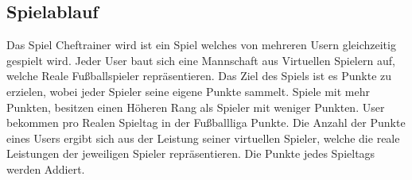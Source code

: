 \subsection{Spielablauf}
Das Spiel Cheftrainer wird ist ein Spiel welches von mehreren Usern gleichzeitig gespielt wird. Jeder User baut sich eine Mannschaft aus Virtuellen Spielern auf, welche Reale Fußballspieler repräsentieren. 
Das Ziel des Spiels ist es Punkte zu erzielen, wobei jeder Spieler seine eigene Punkte sammelt. Spiele mit mehr Punkten, besitzen einen Höheren Rang als Spieler mit weniger Punkten. User bekommen pro Realen Spieltag in der Fußballliga Punkte. Die Anzahl der Punkte eines Users ergibt sich aus der Leistung seiner virtuellen Spieler, welche die reale Leistungen der jeweiligen Spieler repräsentieren. Die Punkte jedes Spieltags werden Addiert.
